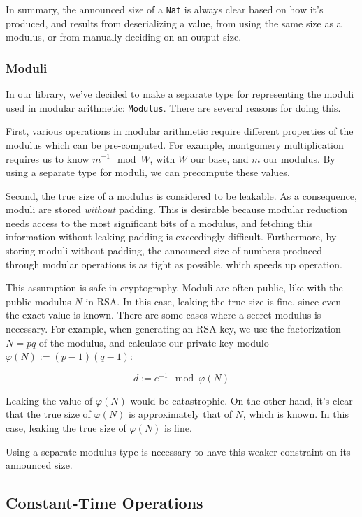 \documentclass[11pt, a4paper]{article} %
\begin{document}
{In summary, the announced size of a \texttt{Nat} is always
clear based on how it's produced, and results from deserializing
a value, from using the same size as a modulus, or from manually
deciding on an output size.

\subsubsection{Moduli}

In our library, we've decided to make a separate type for representing
the moduli used in modular arithmetic: \texttt{Modulus}. There are several
reasons for doing this.

First, various operations in modular arithmetic require different properties
of the modulus which can be pre-computed. For example, montgomery multiplication
requires us to know $m^{-1} \mod W$, with $W$ our base,
and $m$ our modulus. By using a separate type for moduli, we can
precompute these values.

Second, the true size of a modulus is considered to be leakable.
As a consequence, moduli are stored \emph{without} padding.
This is desirable because modular reduction needs access to the most
significant bits of a modulus, and fetching this information without
leaking padding is exceedingly difficult. Furthermore,
by storing moduli without padding, the announced size of numbers produced
through modular operations is as tight as possible, which speeds
up operation.

This assumption is safe in cryptography. Moduli are often public,
like with the public modulus $N$ in RSA. In this case, leaking
the true size is fine, since even the exact value is known. There
are some cases where a secret modulus is necessary. For example,
when generating an RSA key, we use the factorization $N = pq$ of the modulus,
and calculate our private key modulo $\varphi(N) := (p - 1)(q - 1)$:

$$
d := e^{-1} \mod \varphi(N)
$$

Leaking the value of $\varphi(N)$ would be catastrophic. On the other hand,
it's clear that the true size of $\varphi(N)$ is approximately
that of $N$, which is known. In this case, leaking the true size of
$\varphi(N)$ is fine.

Using a separate modulus type is necessary to have this
weaker constraint on its announced size.

\subsection{Constant-Time Operations}

}
\end{document}
